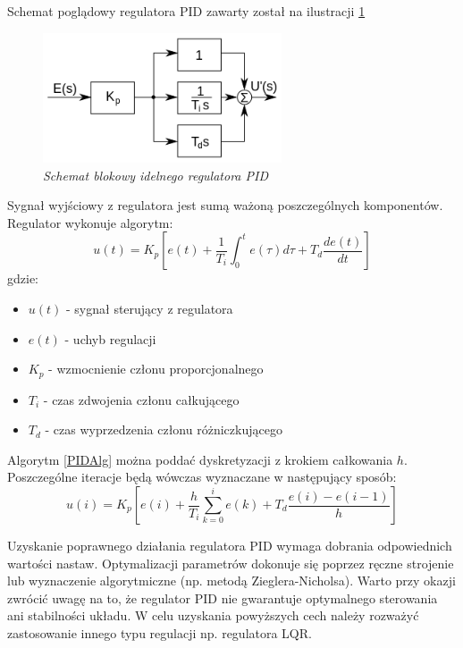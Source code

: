 \documentclass[12pt, oneside]{report}
\theoremstyle{definition}
\begin{document}
Schemat poglądowy regulatora PID zawarty został na ilustracji \ref{PID}

\begin{figure}[H]
	\centering
		\includegraphics[width = 200pt]{PID} 
		\caption{\textit{Schemat blokowy idelnego regulatora PID \cite{PID}}}
		\label{PID}
\end{figure}

Sygnał wyjściowy z regulatora jest sumą ważoną poszczególnych komponentów. Regulator wykonuje algorytm:
\begin{equation} \label{PIDAlg}
u(t) = K_p[e(t) + \frac{1}{T_i}\int_{0}^{t} e(\tau) d\tau + T_d \frac{de(t)}{dt}]
\end{equation}
gdzie:
\begin{itemize}
\item $u(t)$ - sygnał sterujący z regulatora
\item $e(t)$ - uchyb regulacji
\item $K_p$ - wzmocnienie członu proporcjonalnego
\item $T_i$ - czas zdwojenia członu całkującego
\item $T_d$ - czas wyprzedzenia członu różniczkującego
\end{itemize}

Algorytm \ref{PIDAlg} można poddać dyskretyzacji z krokiem całkowania $h$. Poszczególne iteracje będą wówczas wyznaczane w następujący sposób:
\begin{equation}
u(i) = K_p[e(i) + \frac{h}{T_i} \sum_{k=0}^{i} e(k) + T_d \frac{e(i) - e(i-1)}{h}]
\end{equation}

Uzyskanie poprawnego działania regulatora PID wymaga dobrania odpowiednich wartości nastaw. Optymalizacji parametrów dokonuje się poprzez ręczne strojenie lub wyznaczenie algorytmiczne (np. metodą Zieglera-Nicholsa). Warto przy okazji zwrócić uwagę na to, że regulator PID nie gwarantuje optymalnego sterowania ani stabilności układu. W celu uzyskania powyższych cech należy rozważyć zastosowanie innego typu regulacji np. regulatora LQR.
\end{document}
